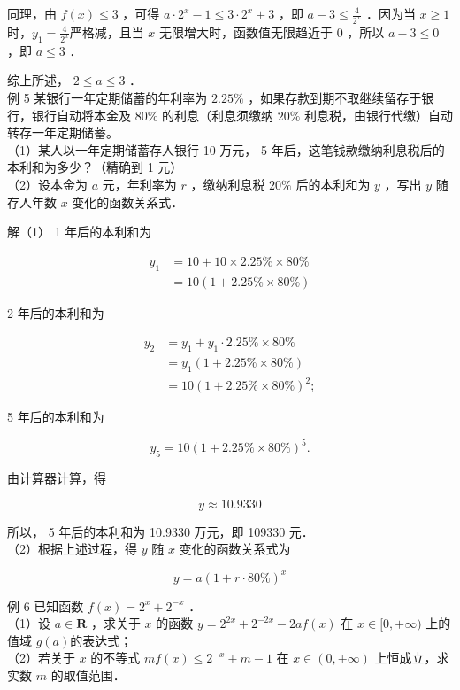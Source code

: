 \documentclass[10pt]{article}
\begin{document}
同理，由 \(f(x) \leqslant 3\) ，可得 \(a \cdot 2^{x}-1 \leqslant 3 \cdot 2^{x}+3\) ，即 \(a-3 \leqslant \frac{4}{2^{x}}\) ．因为当 \(x \geqslant 1\) 时，\(y_{1}=\frac{4}{2^{x}}\)严格减，且当 \(x\) 无限增大时，函数值无限趋近于 0 ，所以 \(a-3 \leqslant 0\) ，即 \(a \leqslant 3\) ．

综上所述， \(2 \leqslant a \leqslant 3\) ．\\
例 5 某银行一年定期储蓄的年利率为 \(2.25 \%\) ，如果存款到期不取继续留存于银行，银行自动将本金及 \(80 \%\) 的利息（利息须缴纳 \(20 \%\) 利息税，由银行代缴）自动转存一年定期储蓄。\\
（1）某人以一年定期储蓄存人银行 10 万元， 5 年后，这笔钱款缴纳利息税后的本利和为多少？（精确到 1 元）\\
（2）设本金为 \(a\) 元，年利率为 \(r\) ，缴纳利息税 \(20 \%\) 后的本利和为 \(y\) ，写出 \(y\) 随存人年数 \(x\) 变化的函数关系式．

解（1） 1 年后的本利和为

\[
\begin{aligned}
y_{1} & =10+10 \times 2.25 \% \times 80 \% \\
& =10(1+2.25 \% \times 80 \%)
\end{aligned}
\]

2 年后的本利和为

\[
\begin{aligned}
y_{2} & =y_{1}+y_{1} \cdot 2.25 \% \times 80 \% \\
& =y_{1}(1+2.25 \% \times 80 \%) \\
& =10(1+2.25 \% \times 80 \%)^{2} ;
\end{aligned}
\]

5 年后的本利和为

\[
y_{5}=10(1+2.25 \% \times 80 \%)^{5} .
\]

由计算器计算，得

\[
y \approx 10.9330
\]

所以， 5 年后的本利和为 10.9330 万元，即 109330 元．\\
（2）根据上述过程，得 \(y\) 随 \(x\) 变化的函数关系式为

\[
y=a(1+r \cdot 80 \%)^{x}
\]

例 6 已知函数 \(f(x)=2^{x}+2^{-x}\) ．\\
（1）设 \(a \in \mathbf{R}\) ，求关于 \(x\) 的函数 \(y=2^{2 x}+2^{-2 x}-2 a f(x)\) 在 \(x \in[0,+\infty)\) 上的值域 \(g(a)\)的表达式；\\
（2）若关于 \(x\) 的不等式 \(m f(x) \leqslant 2^{-x}+m-1\) 在 \(x \in(0,+\infty)\) 上恒成立，求实数 \(m\) 的取值范围．
\end{document}
